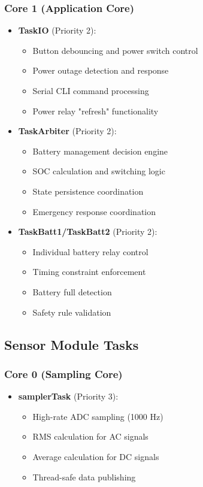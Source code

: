 \documentclass[11pt,a4paper]{article}
\begin{document}
\subsubsection{Core 1 (Application Core)}
\begin{itemize}
    \item \textbf{TaskIO} (Priority 2):
    \begin{itemize}
        \item Button debouncing and power switch control
        \item Power outage detection and response
        \item Serial CLI command processing
        \item Power relay "refresh" functionality
    \end{itemize}
    
    \item \textbf{TaskArbiter} (Priority 2):
    \begin{itemize}
        \item Battery management decision engine
        \item SOC calculation and switching logic
        \item State persistence coordination
        \item Emergency response coordination
    \end{itemize}
    
    \item \textbf{TaskBatt1/TaskBatt2} (Priority 2):
    \begin{itemize}
        \item Individual battery relay control
        \item Timing constraint enforcement
        \item Battery full detection
        \item Safety rule validation
    \end{itemize}
\end{itemize}

\subsection{Sensor Module Tasks}

\subsubsection{Core 0 (Sampling Core)}
\begin{itemize}
    \item \textbf{samplerTask} (Priority 3):
    \begin{itemize}
        \item High-rate ADC sampling (1000 Hz)
        \item RMS calculation for AC signals
        \item Average calculation for DC signals
        \item Thread-safe data publishing
    \end{itemize}
\end{itemize}
\end{document}
